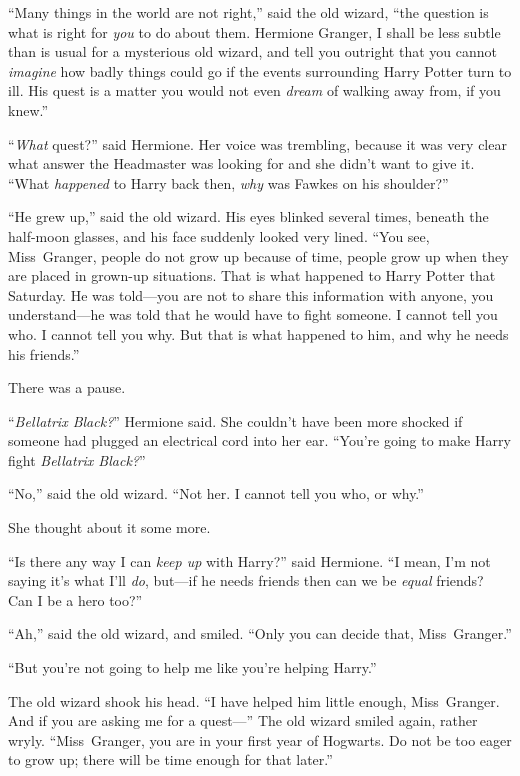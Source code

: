 “Many things in the world are not right,” said the old wizard, “the question is what is right for \emph{you} to do about them. Hermione Granger, I shall be less subtle than is usual for a mysterious old wizard, and tell you outright that you cannot \emph{imagine} how badly things could go if the events surrounding Harry Potter turn to ill. His quest is a matter you would not even \emph{dream} of walking away from, if you knew.”

“\emph{What} quest?” said Hermione. Her voice was trembling, because it was very clear what answer the Headmaster was looking for and she didn’t want to give it. “What \emph{happened} to Harry back then, \emph{why} was Fawkes on his shoulder?”

“He grew up,” said the old wizard. His eyes blinked several times, beneath the half-moon glasses, and his face suddenly looked very lined. “You see, Miss~Granger, people do not grow up because of time, people grow up when they are placed in grown-up situations. That is what happened to Harry Potter that Saturday. He was told—you are not to share this information with anyone, you understand—he was told that he would have to fight someone. I cannot tell you who. I cannot tell you why. But that is what happened to him, and why he needs his friends.”

There was a pause.

“\emph{Bellatrix Black?}” Hermione said. She couldn’t have been more shocked if someone had plugged an electrical cord into her ear. “You’re going to make Harry fight \emph{Bellatrix Black?}”

“No,” said the old wizard. “Not her. I cannot tell you who, or why.”

She thought about it some more.

“Is there any way I can \emph{keep up} with Harry?” said Hermione. “I mean, I’m not saying it’s what I’ll \emph{do}, but—if he needs friends then can we be \emph{equal} friends? Can I be a hero too?”

“Ah,” said the old wizard, and smiled. “Only you can decide that, Miss~Granger.”

“But you’re not going to help me like you’re helping Harry.”

The old wizard shook his head. “I have helped him little enough, Miss~Granger. And if you are asking me for a quest—” The old wizard smiled again, rather wryly. “Miss~Granger, you are in your first year of Hogwarts. Do not be too eager to grow up; there will be time enough for that later.”

